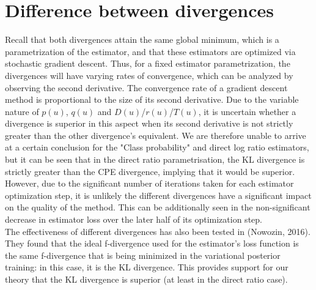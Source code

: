 \documentclass[honours,12pt]{unswthesis}
\numberwithin{equation}{section}
\theoremstyle{definition}
\begin{document}
\section{Difference between divergences}
Recall that both divergences attain the same global minimum, which is a parametrization of the estimator, and that these estimators are optimized via stochastic gradient descent. Thus, for a fixed estimator parametrization, the divergences will have varying rates of convergence, which can be analyzed by observing the second derivative. The convergence rate of a gradient descent method is proportional to the size of its second derivative. Due to the variable nature of $p(u)$, $q(u)$ and $D(u)$/$r(u)$/$T(u)$, it is uncertain whether a divergence is superior in this aspect when its second derivative is not strictly greater than the other divergence's equivalent. We are therefore unable to arrive at a certain conclusion for the "Class probability" and direct log ratio estimators, but it can be seen that in the direct ratio parametrisation, the KL divergence is strictly greater than the CPE divergence, implying that it would be superior. However, due to the significant number of iterations taken for each estimator optimization step, it is unlikely the different divergences have a significant impact on the quality of the method. This can be additionally seen in the non-significant decrease in estimator loss over the later half of its optimization step.\\
The effectiveness of different divergences has also been tested in (Nowozin, 2016). They found that the ideal f-divergence used for the estimator's loss function is the same f-divergence that is being minimized in the variational posterior training: in this case, it is the KL divergence. This provides support for our theory that the KL divergence is superior (at least in the direct ratio case).
\end{document}
